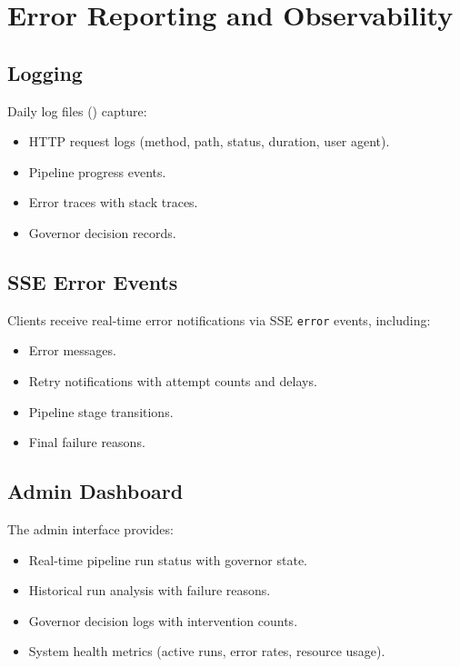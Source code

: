 \section{Error Reporting and Observability}
\label{sec:failure:observability}

\subsection{Logging}

Daily log files () capture:
\begin{itemize}
  \item HTTP request logs (method, path, status, duration, user agent).
  \item Pipeline progress events.
  \item Error traces with stack traces.
  \item Governor decision records.
\end{itemize}

\subsection{SSE Error Events}

Clients receive real-time error notifications via SSE \texttt{error} events, including:
\begin{itemize}
  \item Error messages.
  \item Retry notifications with attempt counts and delays.
  \item Pipeline stage transitions.
  \item Final failure reasons.
\end{itemize}

\subsection{Admin Dashboard}

The admin interface provides:
\begin{itemize}
  \item Real-time pipeline run status with governor state.
  \item Historical run analysis with failure reasons.
  \item Governor decision logs with intervention counts.
  \item System health metrics (active runs, error rates, resource usage).
\end{itemize}

